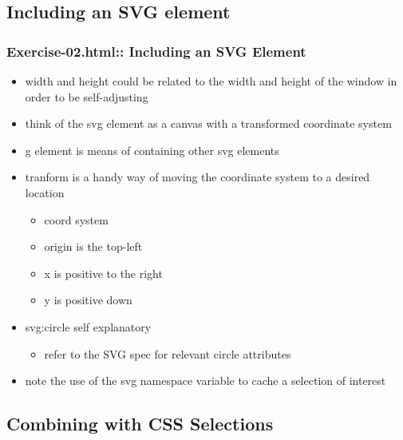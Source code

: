 \documentclass{beamer}
\begin{document}
\begin{frame}
\subsection{Including an SVG element}

\begin{frame}
    \frametitle{Exercise-02.html:: Including an SVG Element}
    \begin{itemize}
    \item width and height could be related to the width and height of the window in order to be self-adjusting
    \item think of the svg element as a canvas with a transformed coordinate system
    \item g element is means of containing other svg elements
    \item tranform is a handy way of moving the coordinate system to a desired location
        \begin{itemize}
        \item coord system
        \item origin is the top-left
        \item x is positive to the right
        \item y is positive down
        \end{itemize}
    \item svg:circle self explanatory
        \begin{itemize}
        \item refer to the SVG spec for relevant circle attributes
        \end{itemize}
    \item note the use of the svg namespace variable to cache a selection of interest
    \end{itemize}
\end{frame}



\subsection{Combining with CSS Selections}


\end{frame}
\end{document}
